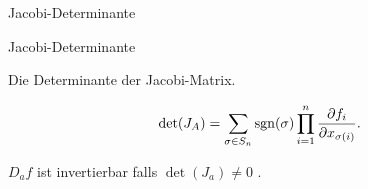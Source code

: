 \documentclass[class=article, crop=false]{standalone}
\begin{document}
\begin{zettel}{Jacobi-Determinante}
\begin{flashcard}[6fe2pofu]{Jacobi-Determinante}
	\begin{definition}
		Die Determinante der Jacobi-Matrix.
	\end{definition}
	\[
		\det(J_A) = \sum_{\sigma \in  S_n } \operatorname{sgn}(\sigma) \prod_{i = 1}^{n} \frac{\partial f_i}{\partial x_{\sigma(i)}}
	.\]
\end{flashcard}
\begin{remark}
	$D_a f$ ist invertierbar falls $\det(J_a) \neq 0$ .
\end{remark}
\end{zettel}
\end{document}
